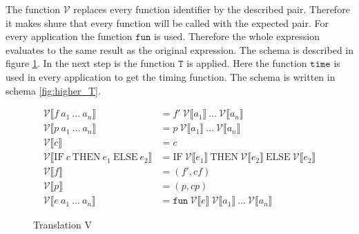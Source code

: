 The function $\mathcal{V}$ replaces every function identifier by the described pair.
Therefore it makes shure that every function will be called with the expected pair.
For every application the function $\texttt{fun}$ is used.
Therefore the whole expression evaluates to the same result as the original expression.
The schema is described in figure \ref{fig:higher_V}.
In the next step is the function $\texttt{T}$ is applied.
Here the function $\texttt{time}$ is used in every application to get the timing function.
The schema is written in schema \ref{fig:higher_T}.
\begin{figure}
  \begin{align*}
    \mathcal{V}\llbracket f\ a_{1}\ \dots\ a_{n}\rrbracket &= f'\ \mathcal{V}\llbracket a_{1}\rrbracket\ \dots \ \mathcal{V}\llbracket a_{n}\rrbracket\\
    \mathcal{V}\llbracket p\ a_{1}\ \dots\ a_{n}\rrbracket &= p\ \mathcal{V}\llbracket a_{1}\rrbracket\ \dots \ \mathcal{V}\llbracket a_{n}\rrbracket\\
    \mathcal{V}\llbracket c \rrbracket &= c\\
    \mathcal{V}\llbracket \text{IF}\ c\ \text{THEN}\ e_{1}\ \text{ELSE}\ e_{2}\rrbracket &= \text{IF}\  \mathcal{V}\llbracket e_{1}\rrbracket\ \text{THEN}\ \mathcal{V}\llbracket e_{2}\rrbracket\ \text{ELSE}\ \mathcal{V}\llbracket e_{2}\rrbracket\\
    \mathcal{V}\llbracket f\rrbracket &= (f',cf)\\
    \mathcal{V}\llbracket p\rrbracket &= (p,cp)\\
    \mathcal{V}\llbracket e\ a_{1}\ \dots\ a_{n}\rrbracket &= \texttt{fun}\ \mathcal{V}\llbracket e\rrbracket\ \mathcal{V}\llbracket a_{1} \rrbracket\ \dots\ \mathcal{V}\llbracket a_{n}\rrbracket
  \end{align*}
  \caption{Translation V}
  \label{fig:higher_V}
\end{figure}
